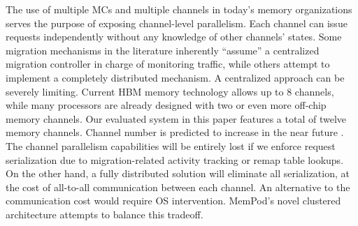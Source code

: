 The use of multiple MCs and multiple channels in today's memory organizations serves the purpose of exposing channel-level parallelism. Each channel can issue requests independently without any knowledge of other channels' states. Some migration mechanisms in the literature inherently ``assume'' a centralized migration controller in charge of monitoring traffic, while others attempt to implement a completely distributed mechanism. A centralized approach can be severely limiting. Current HBM memory technology allows up to 8 channels, while many processors are already designed with two or even more off-chip memory channels. Our evaluated system in this paper features a total of twelve memory channels. Channel number is predicted to increase in the near future \TODO{[cite]}. The channel parallelism capabilities will be entirely lost if we enforce request serialization due to migration-related activity tracking or remap table lookups. On the other hand, a fully distributed solution will eliminate all serialization, at the cost of all-to-all communication between each channel. An alternative to the communication cost would require OS intervention. MemPod's novel clustered architecture attempts to balance this tradeoff. 

